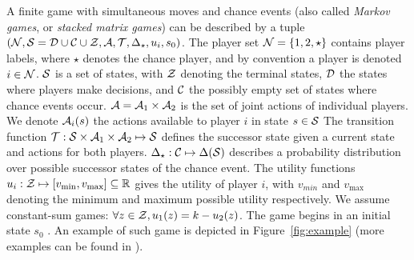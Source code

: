 


A finite game with simultaneous moves and chance events (also called \emph{Markov games}, or \emph{stacked matrix games}) can be described
by a tuple $(\mathcal{N}, \mathcal{S} = \mathcal{D}\cup\mathcal{C}\cup\mathcal{Z}, \mathcal{A}, \mathcal{T}, \Delta_\star, u_i, s_0)$.
The player set $\mathcal{N} = \{ 1, 2, \star \}$ contains player labels, where
$\star$ denotes the chance player, and by convention a player is denoted $i \in \mathcal{N}$.
$\mathcal{S}$ is a set of states, with $\mathcal{Z}$ denoting the terminal states, $\mathcal{D}$ the states where players make decisions,
and $\mathcal{C}$ the possibly empty set of states where chance events occur. $\mathcal{A} = \mathcal{A}_1 \times \mathcal{A}_2$ is the set of
joint actions of individual players. We denote $\mathcal{A}_i(s)$ the actions available to player $i$ in state $s \in \mathcal{S}$ 
The transition function $\mathcal{T} : \mathcal{S} \times \mathcal{A}_1 \times \mathcal{A}_2 \mapsto \mathcal{S}$ defines the successor state given a current
state and actions for both players. $\Delta_\star:\mathcal{C} \mapsto \Delta(\mathcal{S})$ describes a probability distribution over
possible successor states of the chance event.
The utility functions $u_i : \mathcal{Z} \mapsto [v_{\min}, v_{\max}] \subseteq \mathbb{R}$ gives the utility of player $i$, with
$v_{min}$ and $v_{\max}$ denoting the minimum and maximum possible utility respectively. We assume constant-sum
games: $\forall z \in \mathcal{Z}, u_1(z) = k - u_2(z)$.
The game begins in an initial state $s_0$ .
An example of such game is depicted in Figure~\ref{fig:example} (more examples can be found in \cite[Chapter 5]{Saffidine2013thesis}).

